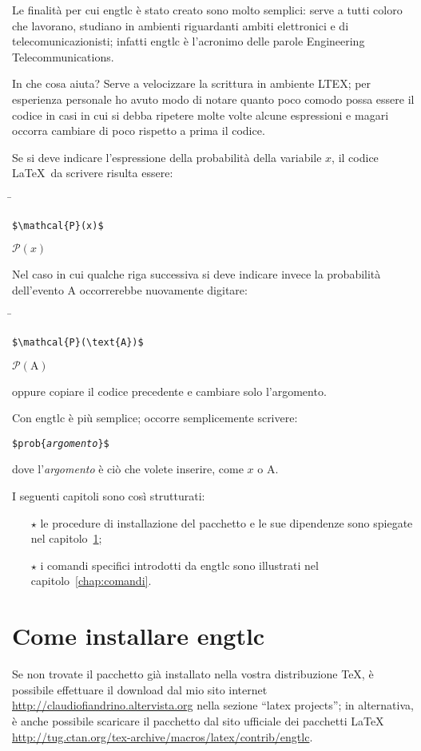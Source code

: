 \documentclass[11pt,a4paper,openany]{book}
\newcommand*{\meta}[1]{{\normalfont\textlangle\textit{#1}\textrangle}}
\newcommand*{\marg}[1]{\texttt{\{\meta{#1}\}}}
\newcommand*{\cs}[1]{\texttt{\char92#1}}
\begin{document}
Le finalità per cui \textsf{engtlc} è stato creato sono molto semplici: serve a tutti coloro che lavorano, studiano in ambienti riguardanti ambiti elettronici e di telecomunicazionisti; infatti engtlc è l'acronimo delle parole Engineering Telecommunications. 

In che cosa aiuta?
Serve a velocizzare la scrittura in ambiente LTEX; per esperienza personale ho avuto modo di notare quanto poco comodo possa essere il codice in casi in cui si debba ripetere molte volte alcune espressioni e magari occorra cambiare di poco rispetto a prima il codice.

Se si deve indicare l’espressione della probabilità della variabile $x$, il codice \LaTeX\ da scrivere risulta essere:
\begin{tabbing}
\hspace{7cm}\=\kill
\begin{lstlisting}
$\mathcal{P}(x)$
\end{lstlisting}  \>   $\mathcal{P}(x)$
\end{tabbing} 
Nel caso in cui qualche riga successiva si deve indicare invece la probabilità dell’evento A occorrerebbe nuovamente digitare:

\begin{tabbing}
\hspace{7cm}\=\kill
\begin{lstlisting}
$\mathcal{P}(\text{A})$ 
\end{lstlisting} \>   $\mathcal{P}(\text{A})$
\end{tabbing} 
oppure copiare il codice precedente e cambiare solo l’argomento.

Con \textsf{engtlc} è più semplice; occorre semplicemente scrivere:
\begin{flushleft}
\texttt{\$\cs{prob}\marg{argomento}\$}
\end{flushleft}
dove l'\meta{argomento} è ciò che volete inserire, come $x$ o A.

I seguenti capitoli sono così strutturati:
\begin{itemize}
\item[$\star$] le procedure di installazione del pacchetto e le sue dipendenze sono spiegate nel capitolo~\ref{chap:installazione};
\item[$\star$] i comandi specifici introdotti da \textsf{engtlc} sono illustrati nel capitolo~\ref{chap:comandi}.
\end{itemize}


\chapter{Come installare \textsf{engtlc}}
\label{chap:installazione}
Se non trovate il pacchetto già installato nella vostra distribuzione \TeX{}, è possibile effettuare il download dal mio sito internet  \url{http://claudiofiandrino.altervista.org} nella sezione ``latex projects''; in alternativa, è anche possibile scaricare il pacchetto dal sito ufficiale dei pacchetti \LaTeX{} \url{http://tug.ctan.org/tex-archive/macros/latex/contrib/engtlc}.
\end{document}
